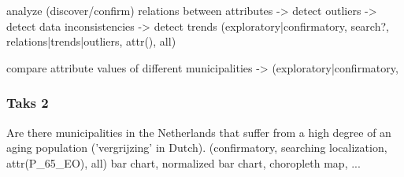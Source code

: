 analyze (discover/confirm) relations between attributes
    -> detect outliers
    -> detect data inconsistencies
    -> detect trends
(exploratory|confirmatory, search?, relations|trends|outliers, attr(), all)

compare attribute values of different municipalities
    -> 
(exploratory|confirmatory, 








\subsubsection{Taks 2}
Are there municipalities in the Netherlands that suffer from a high degree of an aging population ('vergrijzing' in Dutch).
(confirmatory, searching localization, attr(P_65_EO), all)
bar chart, normalized bar chart, choropleth map, ...
